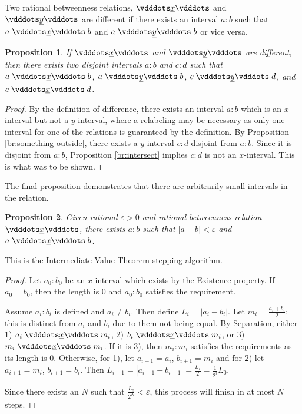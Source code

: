\documentclass{rmj-public}
\newtheorem{proposition}{Proposition}[section]
\begin{document}
Two rational betweenness relations, $\xrel$ and $\xrel[y]$ are different if there exists an interval $a:b$ such that $a \xrel b$ and \sout{$a \xrel[y] b$} or vice versa. 

\begin{proposition}\label{br:different}
    If $\xrel$ and $\xrel[y]$ are different, then there exists two disjoint intervals $a:b$ and $c:d$ such that $a \xrel b$, \sout{$a \xrel[y] b$}, $c \xrel[y] d$, and \sout{$c \xrel d$}.
\end{proposition}


\begin{proof}
    By the definition of difference, there exists an interval $a:b$ which is an $x$-interval but not a $y$-interval, where a relabeling may be necessary as only one interval for one of the relations is guaranteed by the definition. By Proposition \ref{br:something-outside}, there exists a $y$-interval $c:d$ disjoint from $a:b$. Since it is disjoint from $a:b$, Proposition \ref{br:intersect} implies $c:d$ is not an $x$-interval. This is what was to be shown. 
\end{proof}


The final proposition demonstrates that there are arbitrarily small intervals in the relation. 

\begin{proposition}
    Given rational $\varepsilon >0$ and rational betweenness relation $\xrel$, there exists $a:b$ such that $|a-b| < \varepsilon$ and $a \xrel b$. 
\end{proposition}

This is the Intermediate Value Theorem stepping algorithm. 

\begin{proof}
    Let $a_0:b_0$ be an $x$-interval which exists by the Existence property. If $a_0 = b_0$, then the length is 0 and $a_0:b_0$ satisfies the requirement. 
    
    Assume $a_i:b_i$ is defined and $a_i \neq b_i$. Then define $L_i = |a_i - b_i|$. Let $m_i = \frac{a_i + b_i}{2}$; this is distinct from $a_i$ and $b_i$ due to them not being equal. By Separation, either 1) $a_i \xrel m_i$, 2) $b_i \xrel m_i$, or 3) $m_i \xrel m_i$. If it is 3), then $m_i:m_i$ satisfies the requirements as its length is 0. Otherwise, for 1), let $a_{i+1}= a_i$, $b_{i+1} = m_i$ and for 2) let $a_{i+1} = m_i$, $b_{i+1} = b_i$. Then $L_{i+1} = |a_{i+1} - b_{i+1}| = \frac{L_i}{2} = \frac{1}{2^{i}} L_0 $. 

    Since there exists an $N$ such that $\frac{L_0}{2^N} < \varepsilon$, this process will finish in at most $N$ steps. 
\end{proof}
\end{document}
